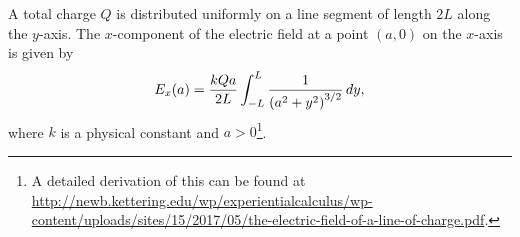 \begin{questions}
\begin{parts}
\begin{solutionorbox}[4.45in]
\end{solutionorbox}

\end{parts}

\question A total charge $Q$ is distributed uniformly on a line segment of length $2L$ along the $y$-axis. The $x$-component of the electric field at a point $(a,0)$ on the $x$-axis is given by 
\[E_x(a)=\frac{kQa}{2L}\displaystyle \int_{-L}^{L} \frac{1}{\left(a^2+y^2\right)^{3/2}} \,d{y},\]
where $k$ is a physical constant and $a>0$\footnote{A detailed derivation of this can be found at \url{http://newb.kettering.edu/wp/experientialcalculus/wp-content/uploads/sites/15/2017/05/the-electric-field-of-a-line-of-charge.pdf}.}.


\end{questions}
